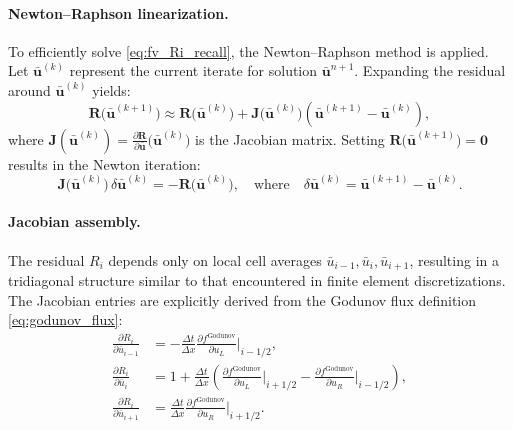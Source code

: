 \paragraph{Newton--Raphson linearization.}
To efficiently solve \eqref{eq:fv_Ri_recall}, the Newton--Raphson method is applied. Let \(\bar{\mathbf{u}}^{(k)}\) represent the current iterate for solution \(\bar{\mathbf{u}}^{n+1}\). Expanding the residual around \(\bar{\mathbf{u}}^{(k)}\) yields:
\begin{equation}
\mathbf{R}\bigl(\bar{\mathbf{u}}^{(k+1)}\bigr)
\approx
\mathbf{R}\bigl(\bar{\mathbf{u}}^{(k)}\bigr)
+
\mathbf{J}\bigl(\bar{\mathbf{u}}^{(k)}\bigr)\left(\bar{\mathbf{u}}^{(k+1)} - \bar{\mathbf{u}}^{(k)}\right),
\end{equation}
where \(\mathbf{J}(\bar{\mathbf{u}}^{(k)})=\frac{\partial\mathbf{R}}{\partial\bar{\mathbf{u}}}\bigl(\bar{\mathbf{u}}^{(k)}\bigr)\) is the Jacobian matrix. Setting \(\mathbf{R}\bigl(\bar{\mathbf{u}}^{(k+1)}\bigr)=\mathbf{0}\) results in the Newton iteration:
\begin{equation}
\mathbf{J}\bigl(\bar{\mathbf{u}}^{(k)}\bigr)\,\delta\bar{\mathbf{u}}^{(k)}
=-\mathbf{R}\bigl(\bar{\mathbf{u}}^{(k)}\bigr),\quad\text{where}\quad
\delta\bar{\mathbf{u}}^{(k)}=\bar{\mathbf{u}}^{(k+1)}-\bar{\mathbf{u}}^{(k)}.
\label{eq:fv_newton_global}
\end{equation}

\paragraph{Jacobian assembly.}
The residual \(R_i\) depends only on local cell averages \(\bar{u}_{i-1}, \bar{u}_i, \bar{u}_{i+1}\), resulting in a tridiagonal structure similar to that encountered in finite element discretizations. The Jacobian entries are explicitly derived from the Godunov flux definition \eqref{eq:godunov_flux}:
\begin{align*}
\frac{\partial R_i}{\partial \bar{u}_{i-1}} &=
    -\frac{\Delta t}{\Delta x}
    \frac{\partial f^{\text{Godunov}}}{\partial u_L}\bigg|_{i-1/2},
\\[0.5em]
\frac{\partial R_i}{\partial \bar{u}_i} &=
    1 + \frac{\Delta t}{\Delta x} \left(
    \frac{\partial f^{\text{Godunov}}}{\partial u_L}\bigg|_{i+1/2}
    - \frac{\partial f^{\text{Godunov}}}{\partial u_R}\bigg|_{i-1/2}
    \right),
\\[0.5em]
\frac{\partial R_i}{\partial \bar{u}_{i+1}} &=
    \frac{\Delta t}{\Delta x}
    \frac{\partial f^{\text{Godunov}}}{\partial u_R}\bigg|_{i+1/2}.
\end{align*}


